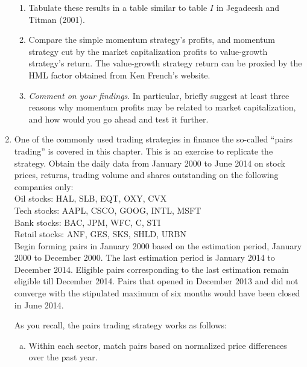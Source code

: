 \begin{enumerate}[1.]
\begin{enumerate}
\item Tabulate these results in a table similar to table $I$ in Jegadeesh
and Titman (2001).

\item Compare the simple momentum strategy's profits, and momentum strategy
cut by the market capitalization profits to value-growth strategy's return.
The value-growth strategy return can be proxied by the HML factor obtained
from Ken French's website.

\item \emph{Comment on your findings}. In particular, briefly suggest at
least three reasons why momentum profits may be related to market
capitalization, and how would you go ahead and test it further.
\end{enumerate}
\hfill
\par\vspace{\baselineskip}


\item One of the commonly used trading strategies in finance the so-called ``pairs trading'' is covered in this chapter. This is an exercise to replicate the strategy. Obtain the daily data from January 2000 to June 2014 on stock prices, returns, trading volume and shares outstanding on the following companies only: \\

\noindent Oil stocks: HAL, SLB, EQT, OXY, CVX \\

\noindent Tech stocks: AAPL, CSCO, GOOG, INTL, MSFT \\

\noindent Bank stocks: BAC, JPM, WFC, C, STI \\

\noindent Retail stocks: ANF, GES, SKS, SHLD, URBN \\


Begin forming pairs in January 2000 based on the estimation period, January 2000 to December 2000. The last estimation period is January 2014 to December 2014. Eligible pairs corresponding to the last estimation remain eligible till December 2014. Pairs that opened in December 2013 and did not converge with the stipulated maximum of six months would have been closed in June 2014.


As you recall, the pairs trading strategy works as follows:
\begin{enumerate}[(a)]
\item Within each sector, match pairs based on normalized price differences over the past year.


\end{enumerate}
\end{enumerate}
